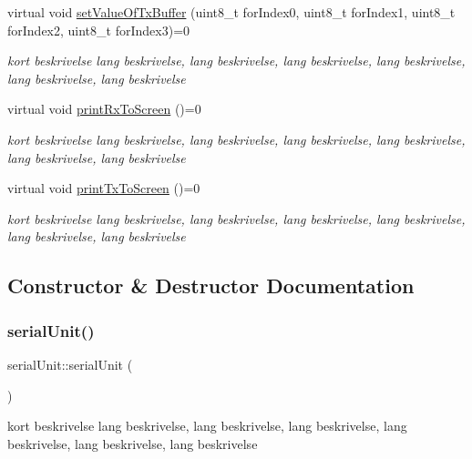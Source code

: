 \begin{DoxyCompactItemize}
virtual void \hyperlink{classserialUnit_a1e70c25a8057dd67330022a292144900}{set\+Value\+Of\+Tx\+Buffer} (uint8\+\_\+t for\+Index0, uint8\+\_\+t for\+Index1, uint8\+\_\+t for\+Index2, uint8\+\_\+t for\+Index3)=0
\begin{DoxyCompactList}\small\item\em kort beskrivelse lang beskrivelse, lang beskrivelse, lang beskrivelse, lang beskrivelse, lang beskrivelse, lang beskrivelse \end{DoxyCompactList}\item 
virtual void \hyperlink{classserialUnit_a3d529e2d2c5908ecf8106ff796e4c3eb}{print\+Rx\+To\+Screen} ()=0
\begin{DoxyCompactList}\small\item\em kort beskrivelse lang beskrivelse, lang beskrivelse, lang beskrivelse, lang beskrivelse, lang beskrivelse, lang beskrivelse \end{DoxyCompactList}\item 
virtual void \hyperlink{classserialUnit_a48e5dcf17a5a551351d7569c43cf96ad}{print\+Tx\+To\+Screen} ()=0
\begin{DoxyCompactList}\small\item\em kort beskrivelse lang beskrivelse, lang beskrivelse, lang beskrivelse, lang beskrivelse, lang beskrivelse, lang beskrivelse \end{DoxyCompactList}\end{DoxyCompactItemize}


\subsection{Constructor \& Destructor Documentation}
\mbox{\label{classserialUnit_af26f4292b42cd782520962aebc9d708e}} 
\subsubsection{\texorpdfstring{serial\+Unit()}{serialUnit()}}
{\footnotesize\ttfamily serial\+Unit\+::serial\+Unit (\begin{DoxyParamCaption}{ }\end{DoxyParamCaption})}



kort beskrivelse lang beskrivelse, lang beskrivelse, lang beskrivelse, lang beskrivelse, lang beskrivelse, lang beskrivelse 


